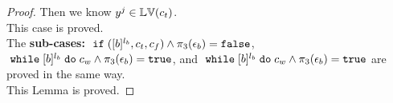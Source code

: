 \begin{proof}
Then we know $y^j \in \mathbb{LV}(c_t)$.
\\
This case is proved.
\\
The \textbf{sub-cases:} 
{$\;\mathtt{if}\; ([b]^{l_b}, c_t, c_f) \land \pi_3(\mathtt{\epsilon}_b) = \mathtt{false}$},
$\;\mathtt{while}\; [b]^{l_b} \;\mathtt{do}\; c_w\land \pi_3(\mathtt{\epsilon}_b) = \mathtt{true}$, 
and $\;\mathtt{while}\; [b]^{l_b} \;\mathtt{do}\; c_w \land \pi_3(\mathtt{\epsilon}_b) = \mathtt{true}$ 
are proved in the same way.
\\
This Lemma is proved.

\end{proof}
